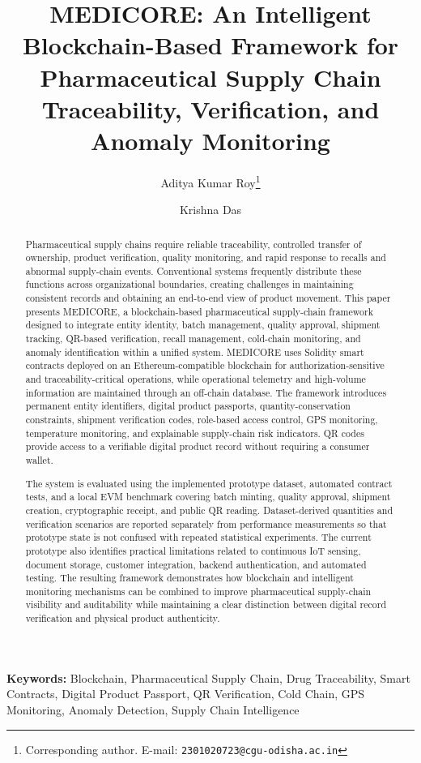 \documentclass[11pt,a4paper]{article}
\title{\textbf{MEDICORE: An Intelligent Blockchain-Based Framework for Pharmaceutical Supply Chain Traceability, Verification, and Anomaly Monitoring}}
\author[1]{Aditya Kumar Roy\thanks{Corresponding author. E-mail: \texttt{2301020723@cgu-odisha.ac.in}}}
\author[1]{Krishna Das}
\affil[1]{Department of Computer Science and Engineering, C. V. Raman Global University, Bhubaneswar, Odisha, 752054, India}
\date{}
\begin{document}
\maketitle

\begin{abstract}
Pharmaceutical supply chains require reliable traceability, controlled transfer of ownership, product verification, quality monitoring, and rapid response to recalls and abnormal supply-chain events. Conventional systems frequently distribute these functions across organizational boundaries, creating challenges in maintaining consistent records and obtaining an end-to-end view of product movement. This paper presents MEDICORE, a blockchain-based pharmaceutical supply-chain framework designed to integrate entity identity, batch management, quality approval, shipment tracking, QR-based verification, recall management, cold-chain monitoring, and anomaly identification within a unified system. MEDICORE uses Solidity smart contracts deployed on an Ethereum-compatible blockchain for authorization-sensitive and traceability-critical operations, while operational telemetry and high-volume information are maintained through an off-chain database. The framework introduces permanent entity identifiers, digital product passports, quantity-conservation constraints, shipment verification codes, role-based access control, GPS monitoring, temperature monitoring, and explainable supply-chain risk indicators. QR codes provide access to a verifiable digital product record without requiring a consumer wallet.

The system is evaluated using the implemented prototype dataset, automated contract tests, and a local EVM benchmark covering batch minting, quality approval, shipment creation, cryptographic receipt, and public QR reading. Dataset-derived quantities and verification scenarios are reported separately from performance measurements so that prototype state is not confused with repeated statistical experiments. The current prototype also identifies practical limitations related to continuous IoT sensing, document storage, customer integration, backend authentication, and automated testing. The resulting framework demonstrates how blockchain and intelligent monitoring mechanisms can be combined to improve pharmaceutical supply-chain visibility and auditability while maintaining a clear distinction between digital record verification and physical product authenticity.
\end{abstract}

\noindent\textbf{Keywords:} Blockchain, Pharmaceutical Supply Chain, Drug Traceability, Smart Contracts, Digital Product Passport, QR Verification, Cold Chain, GPS Monitoring, Anomaly Detection, Supply Chain Intelligence
\end{document}
